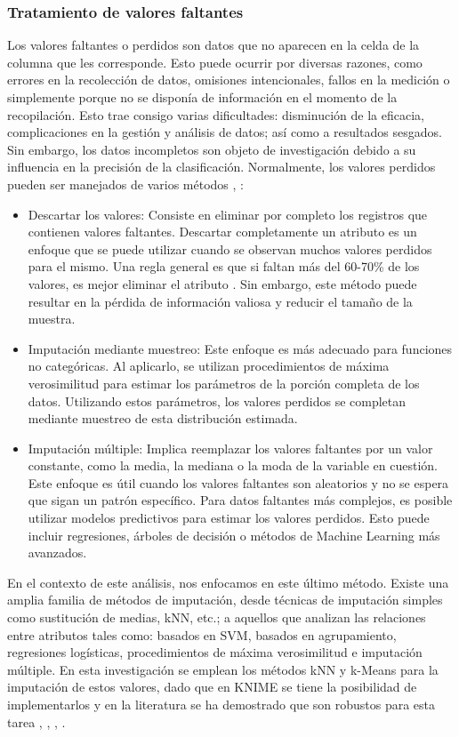 \subsubsection*{Tratamiento de valores faltantes} \label{secc:mv}
Los valores faltantes o perdidos son datos que no aparecen en la celda de la columna que les corresponde. Esto puede ocurrir por diversas razones, como errores en la recolección de datos, omisiones intencionales, fallos en la medición o simplemente porque no se disponía de información en el momento de la recopilación. Esto trae consigo varias dificultades: disminución de la eficacia, complicaciones en la gestión y análisis de datos; así como a resultados sesgados. Sin embargo, los datos incompletos son objeto de investigación debido a su influencia en la precisión de la clasificación. Normalmente, los valores perdidos pueden ser manejados de varios métodos \citep{garcia2015data}, \citep{ventevogel2020construction}:
\begin{itemize}
	\item Descartar los valores: Consiste en eliminar por completo los registros que contienen valores faltantes. Descartar completamente un atributo es un enfoque que se puede utilizar cuando se observan muchos valores perdidos para el mismo. Una regla general es que si faltan más del 60-70\% de los valores, es mejor eliminar el atributo \citep{ventevogel2020construction}. Sin embargo, este método puede resultar en la pérdida de información valiosa y reducir el tamaño de la muestra.
	\item Imputación mediante muestreo: Este enfoque es más adecuado para funciones no categóricas. Al aplicarlo, se utilizan procedimientos de máxima verosimilitud para estimar los parámetros de la porción completa de los datos. Utilizando estos parámetros, los valores perdidos se completan mediante muestreo de esta distribución estimada.
	\item Imputación múltiple: Implica reemplazar los valores faltantes por un valor constante, como la media, la mediana o la moda de la variable en cuestión. Este enfoque es útil cuando los valores faltantes son aleatorios y no se espera que sigan un patrón específico. Para datos faltantes más complejos, es posible utilizar modelos predictivos para estimar los valores perdidos. Esto puede incluir regresiones, árboles de decisión o métodos de Machine Learning más avanzados.
\end{itemize}
En el contexto de este análisis, nos enfocamos en este último método. Existe una amplia familia de métodos de imputación, desde técnicas de imputación simples como sustitución de medias, kNN, etc.; a aquellos que analizan las relaciones entre atributos tales como: basados en SVM, basados en agrupamiento, regresiones logísticas, procedimientos de máxima verosimilitud e imputación múltiple. En esta investigación se emplean los métodos kNN y k-Means para la imputación de estos valores, dado que en KNIME se tiene la posibilidad de implementarlos y en la literatura se ha demostrado que son robustos para esta tarea \citep{tsai2022empirical}, \citep{batista2003analysis}, \citep{patil2010missing}, \citep{li2004towards}.\\
